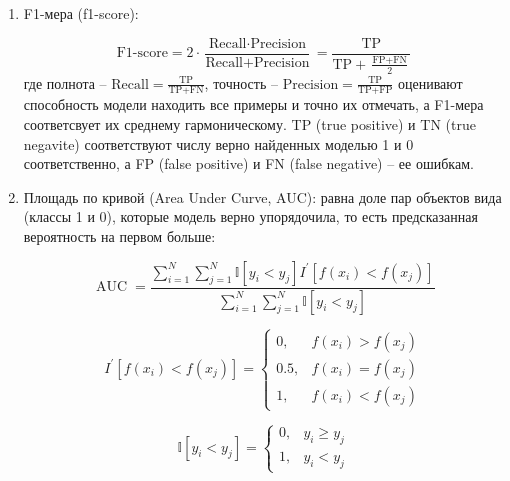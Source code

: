 \begin{enumerate}

    \item F1-мера (f1-score):

\begin{equation}
    \text{F1-score} = 2 \cdot \frac{\text{Recall} \cdot \text{Precision}}{\text{Recall} + \text{Precision}} = \frac{\text{TP}}{\text{TP} + \frac{\text{FP} + \text{FN}}{2}}
\end{equation}
где полнота -- \(\text{Recall} = \frac{\text{TP}}{\text{TP} + \text{FN}}\), точность -- \(\text{Precision} = \frac{\text{TP}}{\text{TP} + \text{FP}}\) оценивают способность модели находить все примеры и точно их отмечать, а F1-мера соответсвует их среднему гармоническому. TP (true positive) и TN (true negavite) соответствуют числу верно найденных моделью 1 и 0 соответственно, а FP (false positive) и FN (false negative) -- ее ошибкам. 

    \item Площадь по кривой (Area Under Curve, AUC): равна доле пар объектов вида (классы 1 и 0), которые модель верно упорядочила, то есть предсказанная вероятность на первом больше:

\begin{equation}
    \operatorname{AUC} = \frac{\sum \limits_{i=1}^{N} \sum \limits_{j=1}^{N} \mathbb{I} [y_i < y_j] I^{\prime}[f(x_{i}) < f(x_{j})]}{\sum \limits_{i=1}^{N} \sum \limits_{j=1}^{N} \mathbb{I} [y_i < y_j]}
\end{equation}

\begin{equation}
    I^{\prime}\left[f(x_{i}) < f(x_{j})\right]=
    \left\{
      \begin{array}{ll}
        0, & f(x_{i}) > f(x_{j}) \\
        0.5, & f(x_{i}) = f(x_{j}) \\
        1, & f(x_{i}) < f(x_{j})
      \end{array}
    \right.
\end{equation}

\begin{equation}
    \mathbb{I} \left[ y_{i}< y_{j} \right]=
    \left\{
      \begin{array}{ll}
        0, & y_{i} \geq y_{j} \\
        1, & y_{i} < y_{j}
      \end{array}
    \right.
\end{equation}
\end{enumerate}


